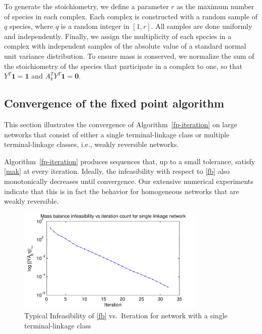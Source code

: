 \documentclass[smallextended]{svjour3}       %
\newcommand*{\0}{\mathbf{0}}
\newcommand*{\1}{\mathbf{1}}
\begin{document}
To generate the stoichiometry, we define a parameter $r$ as the maximum 
number of species in each complex. Each complex is constructed with a random
sample of $q$ species, where $q$ is a random integer in $[1,r]$.  All samples
are done uniformly and independently.  Finally, we assign the multiplicity of
each species in a complex with independent samples of the absolute value of a
standard normal unit variance distribution. To ensure mass is conserved, we
normalize the sum of the stoichiometry of the species that participate in a
complex to one, so that $Y^T\1 = \1$ and $A_k^TY^T \1 = \0$. 

\subsection{Convergence of the fixed point algorithm}
\label{scn:convergence} 

This section illustrates the convergence of Algorithm~\ref{fp-iteration} on
large networks that consist of either a single terminal-linkage class 
or multiple terminal-linkage classes, i.e., weakly reversible networks.

Algorithm~\ref{fp-iteration} produces sequences that, up to a small tolerance,
satisfy \eqref{mak} at every iteration. Ideally, the infeasibility with 
respect to \eqref{fb} also monotonically decreases until convergence.  Our
extensive numerical experiments indicate that this is in fact the behavior for
homogeneous networks that are weakly reversible.

\begin{figure}%
   \centering 
   \includegraphics[width=0.8\textwidth]{InfeasibilityVsIteration}
   \caption{Typical Infeasibility of \eqref{fb} vs.\ Iteration for network with a
            single terminal-linkage class} 
   \label{fig:typical-infeas-single} 
\end{figure}
\end{document}
